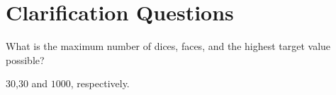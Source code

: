 \section{Clarification Questions}

\begin{QandA}
	\begin{questionitem} \begin{question} What is the maximum number of dices, faces, and the highest target value possible?  \end{question} 	 
    \begin{answered}
		$30$,$30$ and $1000$, respectively.
	\end{answered} \end{questionitem}
	
\end{QandA}

